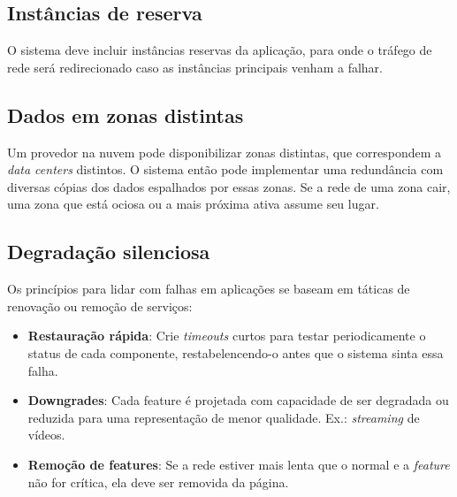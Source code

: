 	\subsection{Instâncias de reserva}
	O sistema deve incluir instâncias reservas da aplicação, para onde o tráfego de rede será redirecionado caso as instâncias principais venham a falhar.

	\subsection{Dados em zonas distintas}
	Um provedor na nuvem pode disponibilizar zonas distintas, que correspondem a \textit{data centers} distintos. O sistema então pode implementar uma redundância com diversas cópias dos dados espalhados por essas zonas. Se a rede de uma zona cair, uma zona que está ociosa ou a mais próxima ativa assume seu lugar.
	
	\subsection{Degradação silenciosa}
 	Os princípios para lidar com falhas em aplicações se baseam em táticas de renovação ou remoção de serviços:
	
	\begin{itemize}
	\item
	\textbf{Restauração rápida}:
	Crie \textit{timeouts} curtos para testar periodicamente o status de cada componente, restabelencendo-o antes que o sistema sinta essa falha.

	\item
	\textbf{Downgrades}:
	Cada feature é projetada com capacidade de ser degradada ou reduzida para uma representação de menor qualidade. Ex.: \textit{streaming} de vídeos.

	\item
	\textbf{Remoção de features}:
	Se a rede estiver mais lenta que o normal e a \textit{feature} não for crítica, ela deve ser removida da página.

	\end{itemize}
	\iffalse
	\subsection{Exemplo: Netflix's Simian Army}

	\subsection{Exemplo: Skype Reverse NAT}
	\fi

\iffalse
\section{Performance}
\section{Segurança}
\fi
